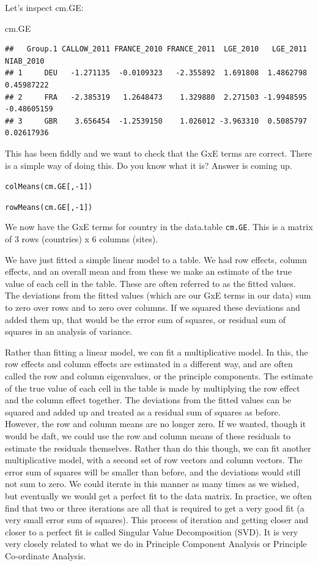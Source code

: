 \documentclass[
]{book}
\newenvironment{Shaded}{\begin{snugshade}}{\end{snugshade}}
\newcommand{\NormalTok}[1]{#1}
\begin{document}
Let's inspect cm.GE:

\begin{Shaded}
\begin{Highlighting}[]
\NormalTok{cm.GE}
\end{Highlighting}
\end{Shaded}

\begin{verbatim}
##   Group.1 CALLOW_2011 FRANCE_2010 FRANCE_2011  LGE_2010   LGE_2011   NIAB_2010
## 1     DEU   -1.271135  -0.0109323   -2.355892  1.691808  1.4862798  0.45987222
## 2     FRA   -2.385319   1.2648473    1.329880  2.271503 -1.9948595 -0.48605159
## 3     GBR    3.656454  -1.2539150    1.026012 -3.963310  0.5085797  0.02617936
\end{verbatim}

This has been fiddly and we want to check that the GxE terms are correct. There is a simple way of doing this. Do you know what it is? Answer is coming up.

\texttt{colMeans(cm.GE{[},-1{]})}

\texttt{rowMeans(cm.GE{[},-1{]})}

We now have the GxE terms for country in the data.table \texttt{cm.GE}. This is a matrix of 3 rows (countries) x 6 columns (sites).

We have just fitted a simple linear model to a table. We had row effects, column effects, and an overall mean and from these we make an estimate of the true value of each cell in the table. These are often referred to as the fitted values. The deviations from the fitted values (which are our GxE terms in our data) sum to zero over rows and to zero over columns. If we squared these deviations and added them up, that would be the error sum of squares, or residual sum of squares in an analysis of variance.

Rather than fitting a linear model, we can fit a multiplicative model. In this, the row effects and column effects are estimated in a different way, and are often called the row and column eigenvalues, or the principle components. The estimate of the true value of each cell in the table is made by multiplying the row effect and the column effect together. The deviations from the fitted values can be squared and added up and treated as a residual sum of squares as before. However, the row and column means are no longer zero. If we wanted, though it would be daft, we could use the row and column means of these residuals to estimate the residuals themselves. Rather than do this though, we can fit another multiplicative model, with a second set of row vectors and column vectors. The error sum of squares will be smaller than before, and the deviations would still not sum to zero. We could iterate in this manner as many times as we wished, but eventually we would get a perfect fit to the data matrix. In practice, we often find that two or three iterations are all that is required to get a very good fit (a very small error sum of squares). This process of iteration and getting closer and closer to a perfect fit is called Singular Value Decomposition (SVD). It is very very closely related to what we do in Principle Component Analysis or Principle Co-ordinate Analysis.
\end{document}
